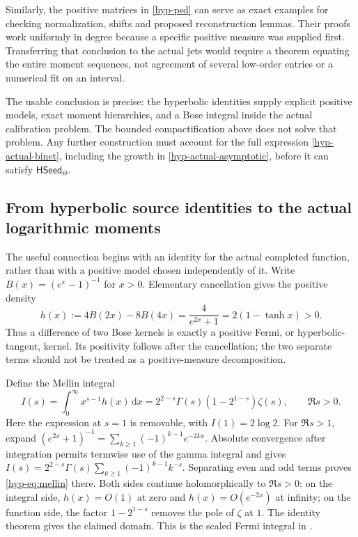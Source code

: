 \documentclass[11pt,a4paper]{article}
\numberwithin{equation}{section}
\theoremstyle{definition}
\theoremstyle{remark}
\newcommand{\HSeed}{\mathsf{HSeed}_{\Theta}}
\begin{document}
Similarly, the positive matrices in \eqref{hyp-psd} can serve as exact
examples for checking normalization, shifts and proposed reconstruction
lemmas. Their proofs work uniformly in degree because a specific positive
measure was supplied first. Transferring that conclusion to the actual
jets would require a theorem equating the entire moment sequences, not
agreement of several low-order entries or a numerical fit on an interval.

The usable conclusion is precise: the hyperbolic identities supply
explicit positive models, exact moment hierarchies, and a Bose integral
inside the actual calibration problem. The bounded compactification
above does not solve that problem. Any further construction must account
for the full expression \eqref{hyp-actual-binet}, including the growth
in \eqref{hyp-actual-asymptotic}, before it can satisfy $\HSeed$.


\subsection{From hyperbolic source identities to the actual logarithmic moments}
\label{hyp-sec:actual-moments}

The useful connection begins with an identity for the actual completed
function, rather than with a positive model chosen independently of it.
Write $B(x)=(e^x-1)^{-1}$ for $x>0$. Elementary cancellation gives the
positive density
\begin{equation}\label{hyp-eq:fermi-density}
h(x):=4B(2x)-8B(4x)
=\frac{4}{e^{2x}+1}=2(1-\tanh x)>0.
\end{equation}
Thus a difference of two Bose kernels is exactly a positive Fermi,
or hyperbolic-tangent, kernel. Its positivity follows after the
cancellation; the two separate terms should not be treated as a
positive-measure decomposition.

Define the Mellin integral
\begin{equation}\label{hyp-eq:mellin}
I(s)=\int_0^\infty x^{s-1}h(x)\,\mathrm dx
=2^{2-s}\Gamma(s)(1-2^{1-s})\zeta(s),
\qquad \Re s>0.
\end{equation}
Here the expression at $s=1$ is removable, with $I(1)=2\log2$.
For $\Re s>1$, expand
$(e^{2x}+1)^{-1}=\sum_{k\geq1}(-1)^{k-1}e^{-2kx}$.
Absolute convergence after integration permits termwise use of the
gamma integral and gives
$I(s)=2^{2-s}\Gamma(s)\sum_{k\geq1}(-1)^{k-1}k^{-s}$.
Separating even and odd terms proves \eqref{hyp-eq:mellin} there.
Both sides continue holomorphically to $\Re s>0$: on the integral
side, $h(x)=O(1)$ at zero and $h(x)=O(e^{-2x})$ at infinity;
on the function side, the factor $1-2^{1-s}$ removes the pole of
$\zeta$ at $1$. The identity theorem gives the claimed domain.
This is the scaled Fermi integral in \cite[Eq.~25.5.3]{dlmf-fermi}.
\end{document}

